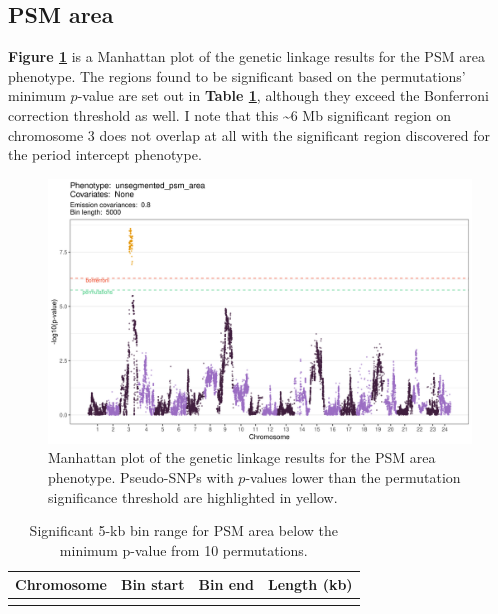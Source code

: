 \documentclass[
]{book}
\begin{document}
\hypertarget{psm-area}{%
\subsection{PSM area}\label{psm-area}}

\textbf{Figure \ref{fig:psm-manhattan}} is a Manhattan plot of the genetic linkage results for the PSM area phenotype. The regions found to be significant based on the permutations' minimum \(p\)-value are set out in \textbf{Table \ref{tab:somite-sig-psm-tbl}}, although they exceed the Bonferroni correction threshold as well. I note that this \textasciitilde6 Mb significant region on chromosome 3 does not overlap at all with the significant region discovered for the period intercept phenotype.



\begin{figure}
\includegraphics[width=1\linewidth]{figs/somites/manhattan_psm_no-covariates} \caption{Manhattan plot of the genetic linkage results for the PSM area phenotype. Pseudo-SNPs with \(p\)-values lower than the permutation significance threshold are highlighted in yellow.}\label{fig:psm-manhattan}
\end{figure}

\begin{table}

\caption{\label{tab:somite-sig-psm-tbl}Significant 5-kb bin range for PSM area below the minimum p-value from 10 permutations.}
\centering
\begin{tabular}[t]{rrrr}
\toprule
Chromosome & Bin start & Bin end & Length (kb)\\
\midrule
\cellcolor{gray!6}{3} & \cellcolor{gray!6}{20375001} & \cellcolor{gray!6}{26285000} & \cellcolor{gray!6}{5910}\\
\bottomrule
\end{tabular}
\end{table}
\end{document}
